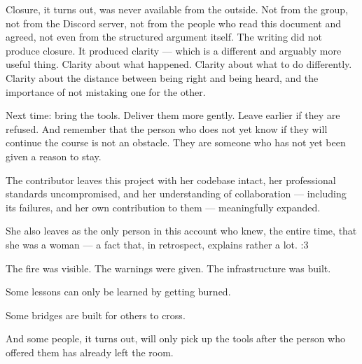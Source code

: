 \documentclass[11pt,a4paper]{book}
\begin{document}
Closure, it turns out, was never available from the outside. Not from the group, not from the Discord server, not from the people who read this document and agreed, not even from the structured argument itself. The writing did not produce closure. It produced clarity --- which is a different and arguably more useful thing. Clarity about what happened. Clarity about what to do differently. Clarity about the distance between being right and being heard, and the importance of not mistaking one for the other.
 
Next time: bring the tools. Deliver them more gently. Leave earlier if they are refused. And remember that the person who does not yet know if they will continue the course is not an obstacle. They are someone who has not yet been given a reason to stay.
 
The contributor leaves this project with her codebase intact, her professional standards uncompromised, and her understanding of collaboration --- including its failures, and her own contribution to them --- meaningfully expanded.
 
She also leaves as the only person in this account who knew, the entire time, that she was a woman --- a fact that, in retrospect, explains rather a lot. :3
 
The fire was visible. The warnings were given. The infrastructure was built.
 
Some lessons can only be learned by getting burned.
 
Some bridges are built for others to cross.
 
And some people, it turns out, will only pick up the tools after the person who offered them has already left the room.

\printbibliography
 
\end{document}
